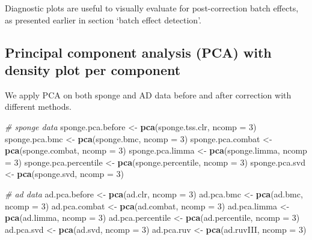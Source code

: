 \documentclass[]{book}
\newenvironment{Shaded}{\begin{snugshade}}{\end{snugshade}}
\newcommand{\KeywordTok}[1]{\textcolor[rgb]{0.13,0.29,0.53}{\textbf{#1}}}
\newcommand{\DataTypeTok}[1]{\textcolor[rgb]{0.13,0.29,0.53}{#1}}
\newcommand{\DecValTok}[1]{\textcolor[rgb]{0.00,0.00,0.81}{#1}}
\newcommand{\StringTok}[1]{\textcolor[rgb]{0.31,0.60,0.02}{#1}}
\newcommand{\CommentTok}[1]{\textcolor[rgb]{0.56,0.35,0.01}{\textit{#1}}}
\newcommand{\NormalTok}[1]{#1}
\begin{document}
Diagnostic plots are useful to visually evaluate for post-correction
batch effects, as presented earlier in section `batch effect detection'.

\subsection{Principal component analysis (PCA) with density plot per
component}\label{principal-component-analysis-pca-with-density-plot-per-component-1}

We apply PCA on both sponge and AD data before and after correction with
different methods.

\begin{Shaded}
\begin{Highlighting}[]
\CommentTok{# sponge data}
\NormalTok{sponge.pca.before <-}\StringTok{ }\KeywordTok{pca}\NormalTok{(sponge.tss.clr, }\DataTypeTok{ncomp =} \DecValTok{3}\NormalTok{)}
\NormalTok{sponge.pca.bmc <-}\StringTok{ }\KeywordTok{pca}\NormalTok{(sponge.bmc, }\DataTypeTok{ncomp =} \DecValTok{3}\NormalTok{)}
\NormalTok{sponge.pca.combat <-}\StringTok{ }\KeywordTok{pca}\NormalTok{(sponge.combat, }\DataTypeTok{ncomp =} \DecValTok{3}\NormalTok{)}
\NormalTok{sponge.pca.limma <-}\StringTok{ }\KeywordTok{pca}\NormalTok{(sponge.limma, }\DataTypeTok{ncomp =} \DecValTok{3}\NormalTok{)}
\NormalTok{sponge.pca.percentile <-}\StringTok{ }\KeywordTok{pca}\NormalTok{(sponge.percentile, }\DataTypeTok{ncomp =} \DecValTok{3}\NormalTok{)}
\NormalTok{sponge.pca.svd <-}\StringTok{ }\KeywordTok{pca}\NormalTok{(sponge.svd, }\DataTypeTok{ncomp =} \DecValTok{3}\NormalTok{)}

\CommentTok{# ad data}
\NormalTok{ad.pca.before <-}\StringTok{ }\KeywordTok{pca}\NormalTok{(ad.clr, }\DataTypeTok{ncomp =} \DecValTok{3}\NormalTok{)}
\NormalTok{ad.pca.bmc <-}\StringTok{ }\KeywordTok{pca}\NormalTok{(ad.bmc, }\DataTypeTok{ncomp =} \DecValTok{3}\NormalTok{)}
\NormalTok{ad.pca.combat <-}\StringTok{ }\KeywordTok{pca}\NormalTok{(ad.combat, }\DataTypeTok{ncomp =} \DecValTok{3}\NormalTok{)}
\NormalTok{ad.pca.limma <-}\StringTok{ }\KeywordTok{pca}\NormalTok{(ad.limma, }\DataTypeTok{ncomp =} \DecValTok{3}\NormalTok{)}
\NormalTok{ad.pca.percentile <-}\StringTok{ }\KeywordTok{pca}\NormalTok{(ad.percentile, }\DataTypeTok{ncomp =} \DecValTok{3}\NormalTok{)}
\NormalTok{ad.pca.svd <-}\StringTok{ }\KeywordTok{pca}\NormalTok{(ad.svd, }\DataTypeTok{ncomp =} \DecValTok{3}\NormalTok{)}
\NormalTok{ad.pca.ruv <-}\StringTok{ }\KeywordTok{pca}\NormalTok{(ad.ruvIII, }\DataTypeTok{ncomp =} \DecValTok{3}\NormalTok{)}
\end{Highlighting}
\end{Shaded}
\end{document}
